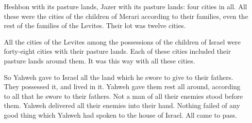 {Heshbon with its pasture lands, Jazer with its pasture lands: four cities in all.
All these were the cities of the children of Merari according to their families, even the rest of the families of the Levites. Their lot was twelve cities.
\par }{\PP {}All the cities of the Levites among the possessions of the children of Israel were forty-eight cities with their pasture lands.
Each of these cities included their pasture lands around them. It was this way with all these cities.
\par }{\PP {}So Yahweh gave to Israel all the land which he swore to give to their fathers. They possessed it, and lived in it.
Yahweh gave them rest all around, according to all that he swore to their fathers. Not a man of all their enemies stood before them. Yahweh delivered all their enemies into their hand.
Nothing failed of any good thing which Yahweh had spoken to the house of Israel. All came to pass.

}

